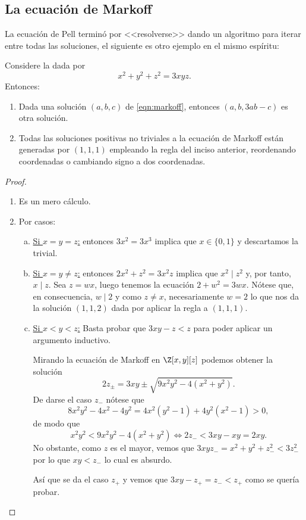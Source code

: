 \documentclass[teoria-numeros.tex]{subfiles}
\begin{document}
\subsection{La ecuación de Markoff}
La ecuación de Pell terminó por <<resolverse>> dando un algoritmo para iterar entre todas las soluciones,
el siguiente es otro ejemplo en el mismo espíritu:
\begin{thm}
	Considere la  dada por
	\begin{equation}
		x^2 + y^2 + z^2 = 3xyz.
		\label{eqn:markoff}
	\end{equation}
	Entonces:
	\begin{enumerate}
		\item Dada una solución $(a, b, c)$ de \eqref{eqn:markoff}, entonces $(a, b, 3ab - c)$ es otra solución.
		\item Todas las soluciones positivas no triviales a la ecuación de Markoff están generadas por $(1, 1, 1)$ empleando la regla del inciso anterior,
			reordenando coordenadas o cambiando signo a dos coordenadas.
	\end{enumerate}
\end{thm}
\begin{proof}
	\begin{enumerate}
		\item Es un mero cálculo.
		\item Por casos:
			\begin{enumerate}[(a)]
				\item \underline{Si $x = y = z$:} entonces $3x^2 = 3x^3$ implica que $x \in \{ 0, 1 \}$ y descartamos la trivial.
				\item \underline{Si $x = y \ne z$:} entonces $2x^2 + z^2 = 3x^2z$ implica que $x^2 \mid z^2$ y, por tanto, $x \mid z$.
					Sea $z = wx$, luego tenemos la ecuación $2 + w^2 = 3wx$.
					Nótese que, en consecuencia, $w \mid 2$ y como $z \ne x$, necesariamente $w = 2$ lo que nos da
					la solución $(1, 1, 2)$ dada por aplicar la regla a $(1, 1, 1)$.
				\item \underline{Si $x < y < z$:}
					Basta probar que $3xy - z < z$ para poder aplicar un argumento inductivo.

					Mirando la ecuación de Markoff en $\Z[x, y][z]$ podemos obtener la solución
					$$ 2z_\pm = 3xy \pm \sqrt{ 9x^2y^2 - 4(x^2 + y^2) }. $$
					De darse el caso $z_-$ nótese que
					$$ 8x^2y^2 - 4x^2 - 4y^2 = 4x^2(y^2 - 1) + 4y^2(x^2 - 1) > 0, $$
					de modo que
					$$ x^2y^2 < 9x^2y^2 - 4(x^2 + y^2) \iff 2z_- < 3xy - xy = 2xy. $$
					No obstante, como $z$ es el mayor, vemos que $3xyz_- = x^2 + y^2 + z_-^2 < 3z_-^2$ por lo que $xy < z_-$
					lo cual es absurdo.

					Así que se da el caso $z_+$ y vemos que $3xy - z_+ = z_- < z_+$ como se quería probar. \qedhere
			\end{enumerate}
	\end{enumerate}
\end{proof}
\end{document}
